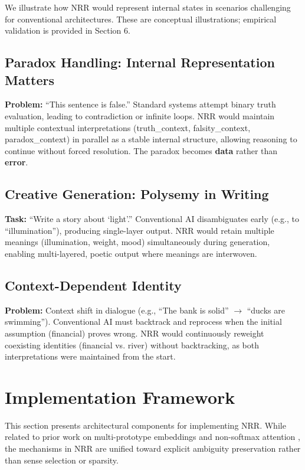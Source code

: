 \documentclass[11pt,a4paper]{article}
\begin{document}
We illustrate how NRR would represent internal states in scenarios challenging for conventional architectures. These are conceptual illustrations; empirical validation is provided in Section 6.

\subsection{Paradox Handling: Internal Representation Matters}

\textbf{Problem:} ``This sentence is false.''
Standard systems attempt binary truth evaluation, leading to contradiction or infinite loops.
NRR would maintain multiple contextual interpretations (truth\_context, falsity\_context, paradox\_context) in parallel as a stable internal structure, allowing reasoning to continue without forced resolution.
The paradox becomes \textbf{data} rather than \textbf{error}.

\subsection{Creative Generation: Polysemy in Writing}

\textbf{Task:} ``Write a story about `light'.''
Conventional AI disambiguates early (e.g., to ``illumination''), producing single-layer output.
NRR would retain multiple meanings (illumination, weight, mood) simultaneously during generation, enabling multi-layered, poetic output where meanings are interwoven.

\subsection{Context-Dependent Identity}

\textbf{Problem:} Context shift in dialogue (e.g., ``The bank is solid'' $\to$ ``ducks are swimming'').
Conventional AI must backtrack and reprocess when the initial assumption (financial) proves wrong.
NRR would continuously reweight coexisting identities (financial vs. river) without backtracking, as both interpretations were maintained from the start.

\section{Implementation Framework}
\label{sec:implementation}

This section presents architectural components for implementing NRR.
While related to prior work on multi-prototype embeddings \cite{reisinger2010multi, levine2020sensebert, loureiro2022lmms} and non-softmax attention \cite{katharopoulos2020transformers, choromanski2021rethinking}, the mechanisms in NRR are unified toward explicit ambiguity preservation rather than sense selection or sparsity.
\end{document}
